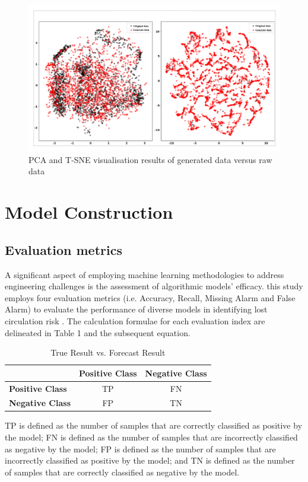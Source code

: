 \documentclass[journal,article,submit,pdftex,moreauthors]{Definitions/mdpi}
\begin{document}
\begin{figure}[H]
    \centering
    \includegraphics[width=0.75\linewidth]{图片/pca tsne.png}
    \caption{PCA and T-SNE visualisation results of generated data versus raw data}
    \label{fig:PCA and TSNE visualisation results of generated data versus raw data}
\end{figure}



\section{Model Construction}
\subsection{Evaluation metrics}

A significant aspect of employing machine learning methodologies to address engineering challenges is the assessment of algorithmic models' efficacy. this study employs four evaluation metrics (i.e. Accuracy, Recall, Missing Alarm and False Alarm\cite{SunW2023}) to evaluate the performance of diverse models in identifying lost circulation risk \cite{ZZY2024}. The calculation formulae for each evaluation index are delineated in Table 1 and the subsequent equation.

\begin{table}[H]
\centering
\caption{True Result vs. Forecast Result}
\begin{tabular}{lcc}
\hline
                      & \textbf{Positive Class} & \textbf{Negative Class} \\ \hline
\textbf{Positive Class} & TP                      & FN                      \\
\textbf{Negative Class} & FP                      & TN                      \\ \hline
\end{tabular}

\label{True Result vs. Forecast Result}
\end{table}
TP is defined as the number of samples that are correctly classified as positive by the model;
FN is defined as the number of samples that are incorrectly classified as negative by the model;
FP is defined as the number of samples that are incorrectly classified as positive by the model; and
TN is defined as the number of samples that are correctly classified as negative by the model.
\end{document}
